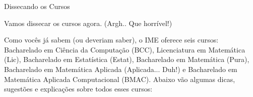 \begin{secao}{Dissecando os Cursos}

Vamos dissecar os cursos agora. (Argh.. Que horrível!)

Como vocês já sabem (ou deveriam saber), o IME oferece seis cursos: Bacharelado
em Ciência da Computação (BCC), Licenciatura em Matemática (Lic), Bacharelado em
Estatística (Estat), Bacharelado em Matemática (Pura), Bacharelado em Matemática
Aplicada (Aplicada... Duh!)  e Bacharelado em Matemática Aplicada Computacional
(BMAC). Abaixo vão algumas dicas, sugestões e explicações sobre todos esses
cursos:
















\end{secao}
